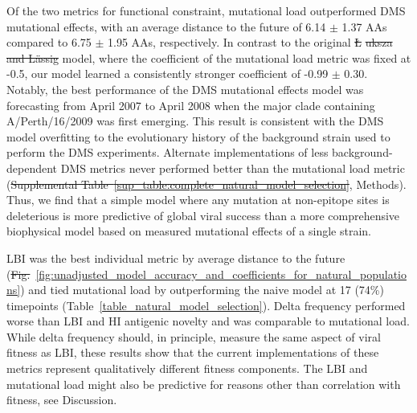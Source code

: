 \documentclass[9pt,lineno]{elife} %
\providecommand{\DIFadd}[1]{{\protect\color{blue}\uwave{#1}}} %
\providecommand{\DIFdel}[1]{{\protect\color{red}\sout{#1}}}                      %
\providecommand{\DIFaddbegin}{} %
\providecommand{\DIFaddend}{} %
\providecommand{\DIFdelbegin}{} %
\providecommand{\DIFdelend}{} %
\providecommand{\DIFaddtex}[1]{{\protect\color{blue}\uwave{#1}}} %
\providecommand{\DIFdeltex}[1]{{\protect\color{red}\sout{#1}}}                      %
\providecommand{\DIFaddbegin}{} %
\providecommand{\DIFaddend}{} %
\providecommand{\DIFdelbegin}{} %
\providecommand{\DIFdelend}{} %
\providecommand{\DIFadd}[1]{\texorpdfstring{\DIFaddtex{#1}}{#1}} %
\providecommand{\DIFdel}[1]{\texorpdfstring{\DIFdeltex{#1}}{}} %
\newcommand{\DIFscaledelfig}{0.5}
\newlength{\DIFdelgraphicswidth} %
\newlength{\DIFdelgraphicsheight} %
\newcommand{\DIFaddincludegraphics}[2][]{{\color{blue}\fbox{\DIFOincludegraphics[#1]{#2}}}} %
\newcommand{\DIFdelincludegraphics}[2][]{%
\sbox{\DIFdelgraphicsbox}{\DIFOincludegraphics[#1]{#2}}%
\settoboxwidth{\DIFdelgraphicswidth}{\DIFdelgraphicsbox} %
\settoboxtotalheight{\DIFdelgraphicsheight}{\DIFdelgraphicsbox} %
\scalebox{\DIFscaledelfig}{%
\parbox[b]{\DIFdelgraphicswidth}{\usebox{\DIFdelgraphicsbox}\\[-\baselineskip] \rule{\DIFdelgraphicswidth}{0em}}\llap{\resizebox{\DIFdelgraphicswidth}{\DIFdelgraphicsheight}{%
\setlength{\unitlength}{\DIFdelgraphicswidth}%
\begin{picture}(1,1)%
\thicklines\linethickness{2pt} %
{\color[rgb]{1,0,0}\put(0,0){\framebox(1,1){}}}%
{\color[rgb]{1,0,0}\put(0,0){\line( 1,1){1}}}%
{\color[rgb]{1,0,0}\put(0,1){\line(1,-1){1}}}%
\end{picture}%
}\hspace*{3pt}}} %
} %
\DeclareRobustCommand{\DIFaddbegin}{\DIFOaddbegin \let\includegraphics\DIFaddincludegraphics} %
\DeclareRobustCommand{\DIFaddend}{\DIFOaddend \let\includegraphics\DIFOincludegraphics} %
\DeclareRobustCommand{\DIFdelbegin}{\DIFOdelbegin \let\includegraphics\DIFdelincludegraphics} %
\DeclareRobustCommand{\DIFdelend}{\DIFOaddend \let\includegraphics\DIFOincludegraphics} %
\begin{document}
Of the two metrics for functional constraint, mutational load outperformed DMS mutational effects, with an average distance to the future of 6.14 $\pm$ 1.37 AAs compared to 6.75 $\pm$ 1.95 AAs, respectively.
In contrast to the original \DIFdelbegin %
\DIFdel{\L}%
\DIFdel{uksza and L\"assig }\DIFdelend \cite{Luksza:2014hj} model, where the coefficient of the mutational load metric was fixed at -0.5, our model learned a consistently stronger coefficient of -0.99 $\pm$ 0.30.
Notably, the best performance of the DMS mutational effects model was forecasting from April 2007 to April 2008 when the major clade containing A/Perth/16/2009 was first emerging.
This result is consistent with the DMS model overfitting to the evolutionary history of the background strain used to perform the DMS experiments.
Alternate implementations of less background-dependent DMS metrics never performed better than the mutational load metric (\DIFdelbegin \DIFdel{Supplemental Table~\ref{sup_table:complete_natural_model_selection}}\DIFdelend \DIFaddbegin \DIFadd{Table~\ref{table:complete_natural_model_selection}}\DIFaddend , Methods).
Thus, we find that a simple model where any mutation at non-epitope sites is deleterious is more predictive of global viral success than a more comprehensive biophysical model based on measured mutational effects of a single strain.

LBI was the best individual metric by average distance to the future (\DIFdelbegin \DIFdel{Fig.}\DIFdelend \DIFaddbegin \DIFadd{Figure}\DIFaddend ~\ref{fig:unadjusted_model_accuracy_and_coefficients_for_natural_populations}) and tied mutational load by outperforming the naive model at 17 (74\%) timepoints (Table~\ref{table_natural_model_selection}).
Delta frequency performed worse than LBI and HI antigenic novelty and was comparable to mutational load.
While delta frequency should, in principle, measure the same aspect of viral fitness as LBI, these results show that the current implementations of these metrics represent qualitatively different fitness components.
The LBI and mutational load might also be predictive for reasons other than correlation with fitness, see Discussion.
\end{document}
